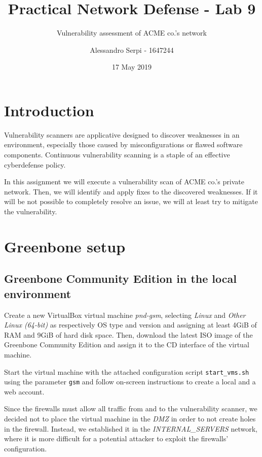 \documentclass{homework}
\title{Practical Network Defense - Lab 9}
\subtitle{Vulnerability assessment of ACME co.'s network}
\author{Alessandro Serpi - 1647244}
\date{17 May 2019}
\begin{document}
    \maketitle
    \tableofcontents
    
    
    \pagebreak
    \section{Introduction}
    Vulnerability scanners are applicative designed to discover weaknesses in an environment, especially those caused by misconfigurations or flawed software components.
    Continuous vulnerability scanning is a staple of an effective cyberdefense policy.
    
    In this assignment we will execute a vulnerability scan of ACME co.'s private network.
    Then,  we will identify and apply fixes to the discovered weaknesses.
    If it will be not possible to completely resolve an issue, we will at least try to mitigate the vulnerability.
    
    
    \section{Greenbone setup}
    \subsection{Greenbone Community Edition in the local environment}
    Create a new VirtualBox virtual machine \textit{pnd-gsm}, selecting \textit{Linux} and \textit{Other Linux (64-bit)} as respectively OS type and version and assigning at least 4GiB of RAM and 9GiB of hard disk space.
    Then, download the latest ISO image of the Greenbone Community Edition and assign it to the CD interface of the virtual machine.
    
    Start the virtual machine with the attached configuration script \texttt{start\_vms.sh} using the parameter \texttt{gsm} and follow on-screen instructions to create a local and a web account.
    
    Since the firewalls must allow all traffic from and to the vulnerability scanner, we decided not to place the virtual machine in the \textit{DMZ} in order to not create holes in the firewall.
    Instead, we established it in the \textit{INTERNAL\_SERVERS} network, where it is more difficult for a potential attacker to exploit the firewalls' configuration.
    
\end{document}

